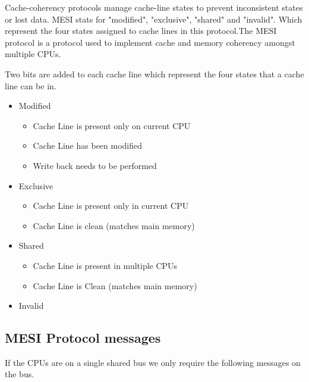 \documentclass{article}
\begin{document}
Cache-coherency protocols manage cache-line states to prevent
inconsistent states or lost data. MESI stats for "modified",
"exclusive", "shared" and "invalid". Which represent the four states
assigned to cache lines in this protocol.The MESI protocol is a
protocol used to implement cache and memory coherency amongst multiple
CPUs. \cite{Birdetal2001}

Two bits are added to each cache line which represent the four states
that a cache line can be in.

\begin{itemize}
\item Modified
  \begin{itemize}
    \item Cache Line is present only on current CPU
    \item Cache Line has been modified
    \item Write back needs to be performed
  \end{itemize}


\item Exclusive
    \begin{itemize}
    \item Cache Line is present only in current CPU
    \item Cache Line is clean (matches main memory)
    \end{itemize}
    
  \item Shared
    \begin{itemize}
    \item Cache Line is present in multiple CPUs
    \item Cache Line is Clean (matches main memory)
    \end{itemize}
  \item Invalid 
\end{itemize}

\subsection{MESI Protocol messages}

If the CPUs are on a single shared bus we only require the following
messages on the bus.
\end{document}
